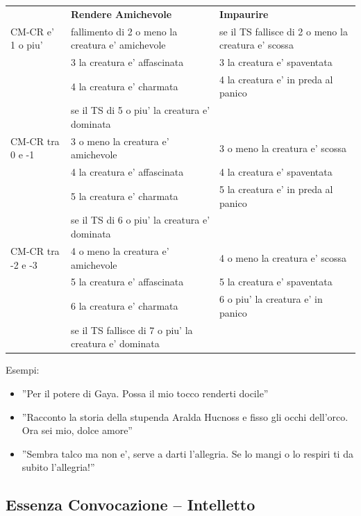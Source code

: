 \documentclass[a4paper,11pt,twoside,openany]{book}
\begin{document}
\begin{tabular}{L{2.5cm} L{7cm} L{7cm}}
\toprule
 & \textbf{Rendere Amichevole} & \textbf{Impaurire}\tabularnewline
CM-CR e' 1 o piu' & fallimento di 2 o meno la creatura e' amichevole & se il TS fallisce di 2 o meno la creatura e' scossa\tabularnewline
& 3 la creatura e' affascinata & 3 la creatura e' spaventata\tabularnewline
& 4 la creatura e' charmata & 4 la creatura e' in preda al panico\tabularnewline
& se il TS di 5 o piu' la creatura e' dominata & \tabularnewline
CM-CR tra 0 e -1 & 3 o meno la creatura e' amichevole & 3 o meno la creatura e' scossa\tabularnewline
& 4 la creatura e' affascinata & 4 la creatura e' spaventata\tabularnewline
& 5 la creatura e' charmata & 5 la creatura e' in preda al panico\tabularnewline
& se il TS di 6 o piu' la creatura e' dominata & \tabularnewline
CM-CR tra -2 e -3 & 4 o meno la creatura e' amichevole & 4 o meno la creatura e' scossa\tabularnewline
 & 5 la creatura e' affascinata & 5 la creatura e' spaventata\tabularnewline
 & 6 la creatura e' charmata & 6 o piu' la creatura e' in panico\tabularnewline
 & se il TS fallisce di 7 o piu' la creatura e' dominata & \tabularnewline
\end{tabular}


\bigskip

Esempi:
\begin{itemize}
\item 
''Per il potere di Gaya. Possa il mio tocco renderti docile'' 
\item 
''Racconto la storia della stupenda Aralda Hucnoss e fisso gli occhi dell'orco. Ora sei mio, dolce amore'' 
\item 
''Sembra talco ma non e', serve a darti l'allegria. Se lo mangi o lo respiri ti da subito l'allegria!'' 
\end{itemize}

\pagebreak

\subsection{Essenza Convocazione -- Intelletto}


\label{essenza-convocazione---intelletto}
\end{document}

